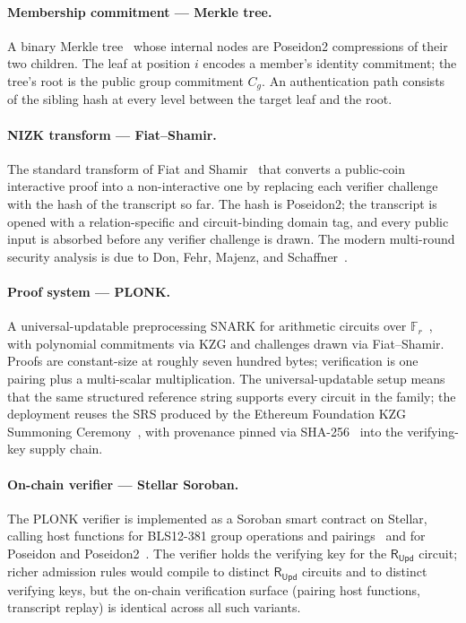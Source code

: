 \documentclass[11pt,a4paper]{article}
\theoremstyle{plain}
\theoremstyle{definition}
\newcommand{\Fr}{\mathbb{F}_r}
\newcommand{\Cg}{C_g}
\newcommand{\RUpd}{\mathsf{R}_{\mathsf{Upd}}}
\begin{document}
\paragraph{Membership commitment --- Merkle tree.}
A binary Merkle tree~\cite{merkle-1989-tree} whose internal nodes
are Poseidon2 compressions of their two children. The leaf at
position $i$ encodes a member's identity commitment; the tree's
root is the public group commitment $\Cg$. An authentication
path consists of the sibling hash at every level between the
target leaf and the root.

\paragraph{NIZK transform --- Fiat--Shamir.}
The standard transform of Fiat and
Shamir~\cite{fiat-shamir-1986} that converts a public-coin
interactive proof into a non-interactive one by replacing each
verifier challenge with the hash of the transcript so far. The
hash is Poseidon2; the transcript is opened with a
relation-specific and circuit-binding domain tag, and every
public input is absorbed before any verifier challenge is drawn.
The modern multi-round security analysis is due to Don, Fehr,
Majenz, and Schaffner~\cite{don-2019-fiat-shamir}.

\paragraph{Proof system --- PLONK.}
A universal-updatable preprocessing SNARK for arithmetic
circuits over $\Fr$~\cite{gabizon-2019-plonk}, with polynomial
commitments via KZG and challenges drawn via Fiat--Shamir. Proofs
are constant-size at roughly seven hundred bytes; verification is
one pairing plus a multi-scalar multiplication. The
universal-updatable setup means that the same structured
reference string supports every circuit in the family; the
deployment reuses the SRS produced by the Ethereum Foundation KZG
Summoning Ceremony~\cite{eth-kzg-ceremony}, with provenance
pinned via SHA-256~\cite{nist-fips-180-4} into the
verifying-key supply chain.

\paragraph{On-chain verifier --- Stellar Soroban.}
The PLONK verifier is implemented as a Soroban smart contract on
Stellar, calling host functions for BLS12-381 group operations
and pairings~\cite{stellar-cap-0059} and for Poseidon and
Poseidon2~\cite{stellar-cap-0075}. The verifier holds the
verifying key for the $\RUpd$ circuit; richer admission rules
would compile to distinct $\RUpd$ circuits and to distinct
verifying keys, but the on-chain verification surface
(pairing host functions, transcript replay) is identical across
all such variants.
\end{document}
